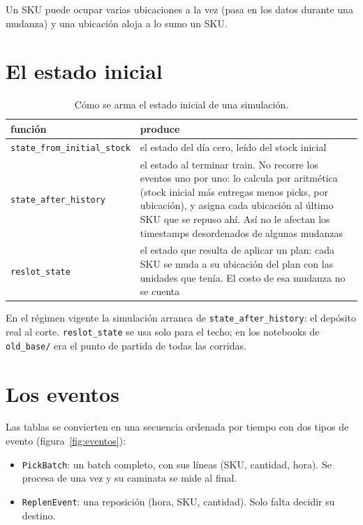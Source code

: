 \documentclass[11pt,a4paper,oneside]{report}
\newcommand{\code}[1]{\texttt{\small #1}}
\begin{document}
Un SKU puede ocupar varias ubicaciones a la vez (pasa en los datos durante una mudanza) y una
ubicación aloja a lo sumo un SKU.

\section{El estado inicial}
\label{sec:estados}

\begin{table}[ht]
\centering\small
\begin{tabularx}{\textwidth}{@{}l L@{}}
\toprule
función & produce \\
\midrule
\code{state\_from\_initial\_stock} & el estado del día cero, leído del stock inicial \\
\code{state\_after\_history} & el estado al terminar train. No recorre los eventos uno por uno: lo calcula por aritmética (stock inicial más entregas menos picks, por ubicación), y asigna cada ubicación al último SKU que se repuso ahí. Así no le afectan los timestamps desordenados de algunas mudanzas \\
\code{reslot\_state} & el estado que resulta de aplicar un plan: cada SKU se muda a su ubicación del plan con las unidades que tenía. El costo de esa mudanza no se cuenta \\
\bottomrule
\end{tabularx}
\caption{Cómo se arma el estado inicial de una simulación.}
\end{table}

En el régimen vigente la simulación arranca de \code{state\_after\_history}: el depósito real al
corte. \code{reslot\_state} se usa solo para el techo; en los notebooks de \code{old\_base/}
era el punto de partida de todas las corridas.

\section{Los eventos}

Las tablas se convierten en una secuencia ordenada por tiempo con dos tipos de evento
(figura~\ref{fig:eventos}):

\begin{itemize}
  \item \code{PickBatch}: un batch completo, con sus líneas (SKU, cantidad, hora). Se procesa
        de una vez y su caminata se mide al final.
  \item \code{ReplenEvent}: una reposición (hora, SKU, cantidad). Solo falta decidir su
        destino.
\end{itemize}
\end{document}
